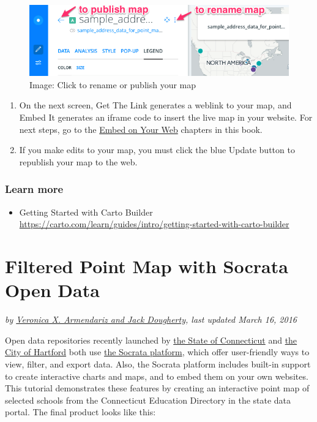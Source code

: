 \documentclass[
  english,
]{book}
\providecommand{\tightlist}{%
  \setlength{\itemsep}{0pt}\setlength{\parskip}{0pt}}
\begin{document}
\begin{figure}
\centering
\includegraphics{images/06-map/carto-publish-map.png}
\caption{Image: Click to rename or publish your map}
\end{figure}

\begin{enumerate}
\def\labelenumi{\arabic{enumi})}
\setcounter{enumi}{19}
\item
  On the next screen, Get The Link generates a weblink to your map, and Embed It generates an iframe code to insert the live map in your website. For next steps, go to the \href{../../embed}{Embed on Your Web} chapters in this book.
\item
  If you make edits to your map, you must click the blue Update button to republish your map to the web.
\end{enumerate}

\hypertarget{learn-more-13}{%
\subsubsection*{Learn more}\label{learn-more-13}}

\begin{itemize}
\tightlist
\item
  Getting Started with Carto Builder \url{https://carto.com/learn/guides/intro/getting-started-with-carto-builder}
\end{itemize}

\hypertarget{filtered-point-map-socrata}{%
\section{Filtered Point Map with Socrata Open Data}\label{filtered-point-map-socrata}}

\emph{by \href{authors}{Veronica X. Armendariz and Jack Dougherty}, last updated March 16, 2016}

Open data repositories recently launched by \href{http://data.ct.gov}{the State of Connecticut} and \href{http://data.hartford.gov}{the City of Hartford} both use \href{http://www.socrata.com}{the Socrata platform}, which offer user-friendly ways to view, filter, and export data. Also, the Socrata platform includes built-in support to create interactive charts and maps, and to embed them on your own websites. This tutorial demonstrates these features by creating an interactive point map of selected schools from the Connecticut Education Directory in the state data portal. The final product looks like this:
\end{document}
